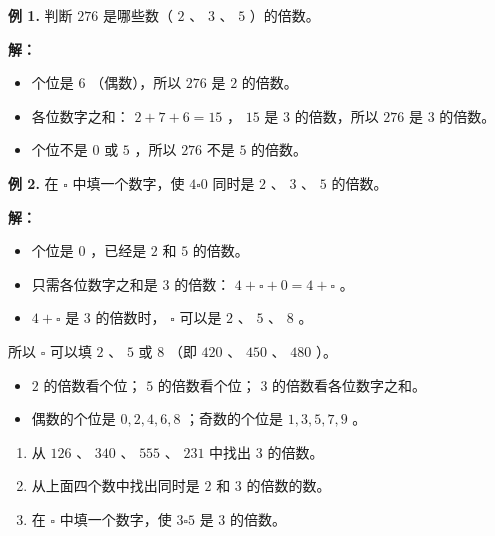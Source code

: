 \begin{workedexamples}


\textbf{例 1.} 判断 $276$ 是哪些数（ $2$ 、 $3$ 、 $5$ ）的倍数。

\textbf{解：}
\begin{itemize}
  \item 个位是 $6$ （偶数），所以 $276$ 是 $2$ 的倍数。
  \item 各位数字之和： $2 + 7 + 6 = 15$ ， $15$ 是 $3$ 的倍数，所以 $276$ 是 $3$ 的倍数。
  \item 个位不是 $0$ 或 $5$ ，所以 $276$ 不是 $5$ 的倍数。
\end{itemize}


\textbf{例 2.} 在 $\square$ 中填一个数字，使 $4\square 0$ 同时是 $2$ 、 $3$ 、 $5$ 的倍数。

\textbf{解：}
\begin{itemize}
  \item 个位是 $0$ ，已经是 $2$ 和 $5$ 的倍数。
  \item 只需各位数字之和是 $3$ 的倍数： $4 + \square + 0 = 4 + \square$ 。
  \item $4 + \square$ 是 $3$ 的倍数时， $\square$ 可以是 $2$ 、 $5$ 、 $8$ 。
\end{itemize}


所以 $\square$ 可以填 $2$ 、 $5$ 或 $8$ （即 $420$ 、 $450$ 、 $480$ ）。

\end{workedexamples}

\begin{keytakeaway}


\begin{itemize}
  \item $2$ 的倍数看个位； $5$ 的倍数看个位； $3$ 的倍数看各位数字之和。
  \item 偶数的个位是 $0, 2, 4, 6, 8$ ；奇数的个位是 $1, 3, 5, 7, 9$ 。
\end{itemize}


\end{keytakeaway}

\begin{practice}


\begin{enumerate}
  \item 从 $126$ 、 $340$ 、 $555$ 、 $231$ 中找出 $3$ 的倍数。
  \item 从上面四个数中找出同时是 $2$ 和 $3$ 的倍数的数。
  \item 在 $\square$ 中填一个数字，使 $3\square 5$ 是 $3$ 的倍数。
\end{enumerate}


\end{practice}

